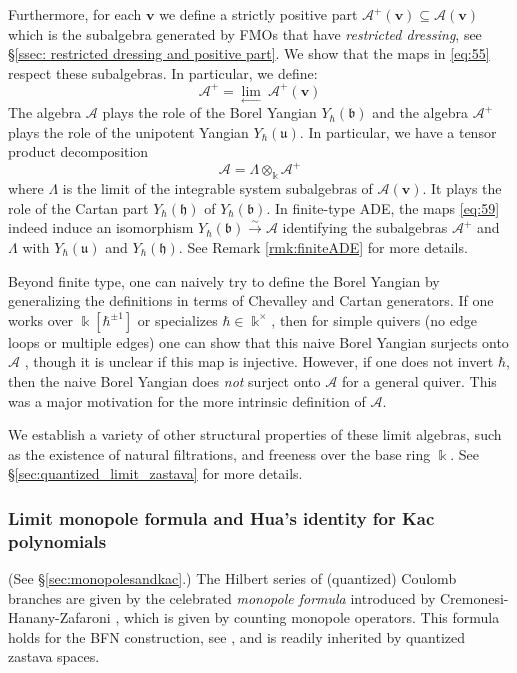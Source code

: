 \documentclass[11pt,reqno]{amsart}
\renewcommand{\mathbf}{\mathbold}
\numberwithin{equation}{section}
\theoremstyle{definition}
\newcommand{\cA}{\mathcal{A}}
\newcommand{\fb}{\mathfrak{b}}
\newcommand{\fh}{\mathfrak{h}}
\newcommand{\fu}{\mathfrak{u}}
\newcommand{\bv}{\mathbf{v}}
\newcommand{\kk}{\Bbbk}
\renewcommand{\bv}{\mathbf{v}} %
\newcommand{\GT}{\Lambda}
\newcommand{\qzast}{\cA}
\newcommand{\qzastplus}{\cA^{+}}
\begin{document}
Furthermore, for each $\bv$ we define a strictly positive part $\qzastplus(\bv) \subseteq \qzast(\bv)$ which is the subalgebra generated by FMOs that have \emph{restricted dressing}, see \S \ref{ssec: restricted dressing and positive part}. We show that the maps in \eqref{eq:55} respect these subalgebras. In particular, we define:
\begin{equation}
  \label{eq:57}
        \qzastplus = \displaystyle{\lim_{\longleftarrow}}~ \qzastplus(\bv)
\end{equation}
The algebra $\qzast$ plays the role of the Borel Yangian $Y_\hbar(\fb)$ and the algebra $\qzastplus$ plays the role of the unipotent Yangian $Y_{\hbar}(\fu)$. In particular, we have a tensor product decomposition
\begin{equation}
  \label{eq:58}
\qzast = \Lambda \otimes_{\kk} \qzastplus 
\end{equation}
where $\Lambda$ is the limit of the integrable system subalgebras of $\cA(\bv)$. It plays the role of the Cartan part $Y_{\hbar}(\fh)$ of $Y_\hbar(\fb)$. In finite-type ADE, the maps \eqref{eq:59} indeed induce an isomorphism $Y_\hbar(\fb) \overset{\sim}{\rightarrow} \qzast$ identifying the subalgebras $\qzastplus$ and $\GT$ with $Y_{\hbar}(\fu)$ and $Y_{\hbar}(\fh)$. See Remark \ref{rmk:finiteADE} for more details. 

Beyond finite type, one can naively try to define the Borel Yangian by generalizing the definitions in terms of Chevalley and Cartan generators. If one works over $\kk[\hbar^{\pm 1}]$ or specializes $\hbar \in \kk^\times$, then for simple quivers (no edge loops or multiple edges) one can show that this naive Borel Yangian surjects onto $\qzast$ \cite[Theorem A and Remark 3.12]{Weekes}, though it is unclear if this map is injective. However, if one does not invert $\hbar$, then the naive Borel Yangian does \emph{not} surject onto  $\qzast$ for a general quiver. This was a major motivation for the more intrinsic definition of $\qzast$.

We establish a variety of other structural properties of these limit algebras, such as the existence of natural filtrations, and freeness over the base ring $\kk$.  See \S \ref{sec:quantized_limit_zastava} for more details.

\subsubsection{Limit monopole formula and Hua's identity for Kac polynomials}
(See \S \ref{sec:monopolesandkac}.)
The Hilbert series of (quantized) Coulomb branches are given by the celebrated \emph{monopole formula} introduced by Cremonesi-Hanany-Zafaroni \cite{CHZ2}, which is given by counting monopole operators. This formula holds for the BFN construction, see \cite[\S 2(iii)]{BFN1}, and is readily inherited by quantized zastava spaces. 
\end{document}
